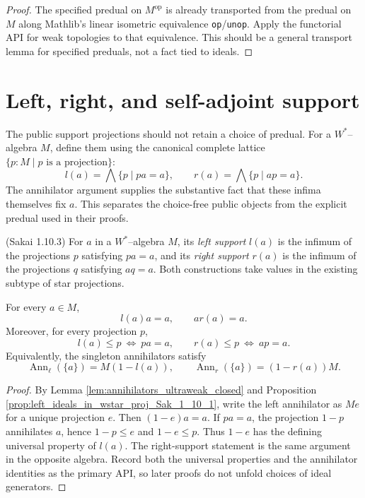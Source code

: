 \begin{proof}
  \notready
  The specified predual on $M^{\mathrm{op}}$ is already transported from the predual on $M$ along
  Mathlib's linear isometric equivalence \texttt{op}/\texttt{unop}.  Apply the functorial API for
  weak topologies to that equivalence.  This should be a general transport lemma for specified
  preduals, not a fact tied to ideals.
\end{proof}

\section{Left, right, and self-adjoint support}

The public support projections should not retain a choice of predual.  For a $W^{*}$--algebra
$M$, define them using the canonical complete lattice
$\{p:M\mid p\text{ is a projection}\}$:
\[
  l(a)=\bigwedge\{p\mid pa=a\},\qquad
  r(a)=\bigwedge\{p\mid ap=a\}.
\]
The annihilator argument supplies the substantive fact that these infima themselves fix $a$.
This separates the choice-free public objects from the explicit predual used in their proofs.

\begin{definition}
  \label{def:left_right_support_Sak_1_10_3} (Sakai 1.10.3)
  \notready
  For $a$ in a $W^{*}$--algebra $M$, its \emph{left support} $l(a)$ is the infimum of the
  projections $p$ satisfying $pa=a$, and its \emph{right support} $r(a)$ is the infimum of the
  projections $q$ satisfying $aq=a$.  Both constructions take values in the existing subtype of
  star projections.
\end{definition}

\begin{proposition}
  \label{prop:left_right_support_characterization}
  \notready
  For every $a\in M$,
  \[
    l(a)a=a,\qquad ar(a)=a.
  \]
  Moreover, for every projection $p$,
  \[
    l(a)\leq p\ \Longleftrightarrow\ pa=a,
    \qquad
    r(a)\leq p\ \Longleftrightarrow\ ap=a.
  \]
  Equivalently, the singleton annihilators satisfy
  \[
    \operatorname{Ann}_{\ell}(\{a\})=M(1-l(a)),\qquad
    \operatorname{Ann}_{r}(\{a\})=(1-r(a))M.
  \]
\end{proposition}

\begin{proof}
  \notready
  By Lemma \ref{lem:annihilators_ultraweak_closed} and Proposition
  \ref{prop:left_ideals_in_wstar_proj_Sak_1_10_1}, write the left annihilator as $Me$ for a unique
  projection $e$.  Then $(1-e)a=a$.  If $pa=a$, the projection $1-p$ annihilates $a$, hence
  $1-p\leq e$ and $1-e\leq p$.  Thus $1-e$ has the defining universal property of $l(a)$.
  The right-support statement is the same argument in the opposite algebra.  Record both the
  universal properties and the annihilator identities as the primary API, so later proofs do not
  unfold choices of ideal generators.
\end{proof}

